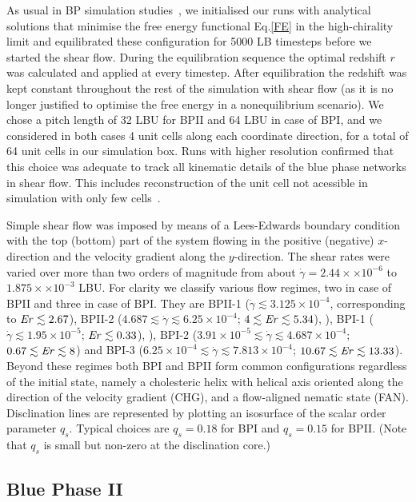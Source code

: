 \documentclass[aps,pre,reprint,superscriptaddress, twocolumn]{revtex4}
\newcommand{\e}[1]{\times10^{#1}}
\newcommand{\gd}{\dot{\gamma}}
\begin{document}
As usual in BP simulation studies~\cite{Henrich:2011a,Henrich:2010b}, we initialised our runs with 
analytical solutions that minimise the free energy functional Eq.\ref{FE} in the high-chirality limit 
and equilibrated these configuration for 5000 LB timesteps before we started the shear flow. 
During the equilibration sequence the optimal redshift $r$ was calculated and applied at every timestep.
After equilibration the redshift was kept constant throughout the rest of the simulation with shear flow (as 
it is no longer justified to optimise the free energy in a nonequilibrium scenario).
We chose a pitch length of 32 LBU for BPII and 64 LBU in case of BPI, and we considered in both cases 
4 unit cells along each coordinate direction, for a total of 64 unit cells in our simulation box.
Runs with higher resolution confirmed that this choice was adequate to track  
all kinematic details of the blue phase networks in shear flow. This includes
reconstruction of the unit cell not acessible in simulation with only
few cells~\cite{Dupuis:2005}.

Simple shear flow was imposed by means of a Lees-Edwards boundary condition ~\cite{Wagner:2002} with
the top (bottom) part of the system flowing in the positive (negative) $x$-direction and the 
velocity gradient along the $y$-direction.
The shear rates were varied over more than two orders of magnitude from about 
$\gd=2.44\times \e{-6}$ to $1.875\times\e{-3}$ LBU.
For clarity we classify various flow regimes, two in case of BPII and three in case of BPI. 
They are BPII-1 ($\gd \lesssim 3.125\e{-4}$, corresponding to ${\it Er} \lesssim 2.67$), 
BPII-2 ($4.687\lesssim \gd\lesssim 6.25\e{-4}$; $4\lesssim {\it Er} \lesssim 5.34$), ),
BPI-1 ($\gd \lesssim 1.95\e{-5}$; ${\it Er} \lesssim 0.33$), ), BPI-2 ($3.91\e{-5}\lesssim \gd \lesssim 4.687\e{-4}$; $0.67\lesssim {\it Er} \lesssim 8$) and BPI-3 ($6.25\e{-4}\lesssim \gd\lesssim 7.813\e{-4}$; $10.67 \lesssim {\it Er} \lesssim 13.33$).
Beyond these regimes both BPI and BPII form common configurations regardless 
of the initial state, namely a cholesteric helix with helical axis 
oriented along the direction of the velocity gradient (CHG), 
and a flow-aligned nematic state (FAN).  
Disclination lines are represented by plotting an isosurface of the scalar order parameter $q_s$. 
Typical choices are $q_s=0.18$ for BPI and $q_s=0.15$ for BPII.
(Note that $q_s$ is small but non-zero at the disclination core.)

\subsection{Blue Phase II}
\end{document}

